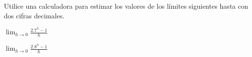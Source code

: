 \item Utilice una calculadora para estimar los valores de los límites siguientes hasta con dos cifras decimales.
\begin{enumerate}
    \begin{minipage}{0.45\textwidth}
    \item[(a)] $\displaystyle \lim_{h \to 0} \frac{2.7^h - 1}{h}$
    \end{minipage}%
    \begin{minipage}{0.45\textwidth}
    \item[(b)] $\displaystyle \lim_{h \to 0} \frac{2.8^h - 1}{h}$
    \end{minipage}
\end{enumerate}
